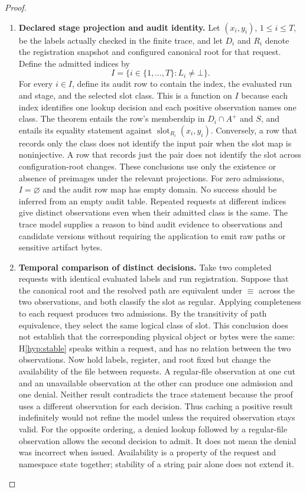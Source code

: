 \documentclass[12pt]{article}
\newcommand{\denied}{\bot}
\newcommand{\slot}{\operatorname{slot}}
\begin{document}
\begin{proof}
\begin{enumerate}
\item \textbf{Declared stage projection and audit identity.}
Let $(x_i,y_i)$, $1\le i\le T$, be the labels actually checked
in the finite trace, and let $D_i$ and $R_i$ denote the
registration snapshot and configured canonical root for that
request. Define the admitted indices by
\begin{equation}
\label{eq:indices}
 I=\{i\in\{1,\ldots,T\}:L_i\ne\denied\}.
\end{equation}
For every $i\in I$, define its audit row to contain the index,
the evaluated run and stage, and the selected slot class.
This is a function on $I$ because each index identifies one
lookup decision and each positive observation names one class.
The theorem entails the row's membership in
$D_i\cap A^+$ and $S$, and entails its equality statement
against $\slot_{R_i}(x_i,y_i)$.
Conversely, a row that records only the class does not
identify the input pair when the slot map is noninjective.
A row that records just the pair does not identify the
slot across configuration-root changes.
These conclusions use only the existence or absence of
preimages under the relevant projections.
For zero admissions, $I=\varnothing$ and the audit row map
has empty domain. No success should be inferred from an empty
audit table. Repeated requests at different indices give distinct
observations even when their admitted class is the same.
The trace model supplies a reason to bind audit evidence to
observations and candidate versions without requiring the
application to emit raw paths or sensitive artifact bytes.

\item \textbf{Temporal comparison of distinct decisions.}
Take two completed requests with identical evaluated labels and
run registration. Suppose that the canonical root and the
resolved path are equivalent under $\equiv$ across the two
observations, and both classify the slot as regular.
Applying completeness to each request produces two admissions.
By the transitivity of path equivalence, they select the same
logical class of slot. This conclusion does not establish
that the corresponding physical object or bytes were the same:
H\ref{hyp:stable} speaks within a request, and has no relation
between the two observations.
Now hold labels, register, and root fixed but change the
availability of the file between requests.
A regular-file observation at one cut and an unavailable
observation at the other can produce one admission and one denial.
Neither result contradicts the trace statement because the
proof uses a different observation for each decision.
Thus caching a positive result indefinitely would not refine
the model unless the required observation stays valid.
For the opposite ordering, a denied lookup followed by a
regular-file observation allows the second decision to admit.
It does not mean the denial was incorrect when issued.
Availability is a property of the request and namespace state
together; stability of a string pair alone does not extend it.


\end{enumerate}
\end{proof}
\end{document}
